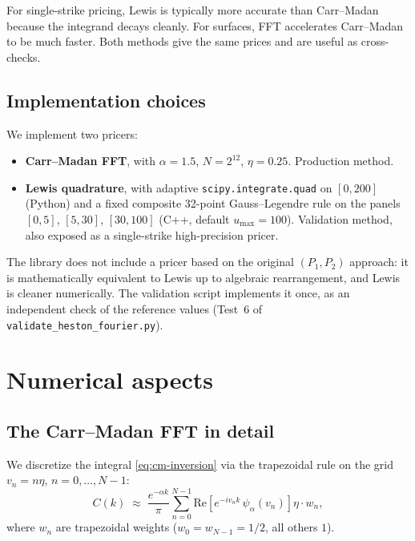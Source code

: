 \documentclass[11pt]{article}
\theoremstyle{plain}
\theoremstyle{definition}
\theoremstyle{remark}
\begin{document}
For single-strike pricing, Lewis is typically more accurate than Carr--Madan because the integrand decays cleanly. For surfaces, FFT accelerates Carr--Madan to be much faster. Both methods give the same prices and are useful as cross-checks.

\subsection{Implementation choices}

We implement two pricers:

\begin{itemize}[topsep=2pt]
    \item \textbf{Carr--Madan FFT}, with \(\alpha = 1.5\), \(N = 2^{12}\), \(\eta = 0.25\). Production method.
    \item \textbf{Lewis quadrature}, with adaptive \texttt{scipy.integrate.quad} on \([0, 200]\) (Python) and a fixed composite 32-point Gauss--Legendre rule on the panels \([0, 5]\), \([5, 30]\), \([30, 100]\) (C++, default \(u_{\max} = 100\)). Validation method, also exposed as a single-strike high-precision pricer.
\end{itemize}

The library does not include a pricer based on the original \((P_1, P_2)\) approach: it is mathematically equivalent to Lewis up to algebraic rearrangement, and Lewis is cleaner numerically. The validation script implements it once, as an independent check of the reference values (Test~6 of \texttt{validate\_heston\_fourier.py}).

\section{Numerical aspects}

\subsection{The Carr--Madan FFT in detail}

We discretize the integral \eqref{eq:cm-inversion} via the trapezoidal rule on the grid \(v_n = n \eta\), \(n = 0, \ldots, N-1\):
\[
    C(k) \;\approx\; \frac{e^{-\alpha k}}{\pi} \sum_{n=0}^{N-1} \mathrm{Re}\!\left[ e^{-i v_n k}\, \psi_\alpha(v_n) \right] \eta \cdot w_n,
\]
where \(w_n\) are trapezoidal weights (\(w_0 = w_{N-1} = 1/2\), all others \(1\)).
\end{document}
